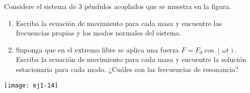 \item
\begin{minipage}[t][3.5cm]{0.7\textwidth}
Considere el sistema de 3 péndulos acoplados que se muestra en la figura.
\begin{enumerate}
	\item Escriba la ecuación de movimiento para cada masa y encuentre las frecuencias
	propias y los modos normales del sistema. 
	\item Suponga que en el extremo libre se aplica una fuerza $F= F_0 \cos(\omega t)$.
	Escriba la ecuación de movimiento para cada masa y encuentre la solución estacionaria para cada modo.
	¿Cuáles son las frecuencias de resonancia?
\end{enumerate}
\end{minipage}
\begin{minipage}[c][0cm][t]{0.25\textwidth}
  \texttt{[image: ej1-14]}
\end{minipage}



